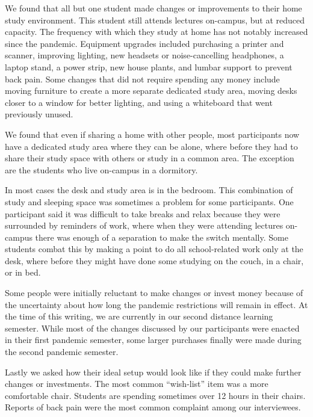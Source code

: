 \documentclass{sigchi}
\begin{document}
We found that all but one student made changes or improvements to their home study environment. This student still attends lectures on-campus, but at reduced capacity. The frequency with which they study at home has not notably increased since the pandemic. Equipment upgrades included purchasing a printer and scanner, improving lighting, new headsets or noise-cancelling headphones, a laptop stand, a power strip, new house plants, and lumbar support to prevent back pain. Some changes that did not require spending any money include moving furniture to create a more separate dedicated study area, moving desks closer to a window for better lighting, and using a whiteboard that went previously unused. 

We found that even if sharing a home with other people, most participants now have a dedicated study area where they can be alone, where before they had to share their study space with others or study in a common area. The exception are the students who live on-campus in a dormitory. 

In most cases the desk and study area is in the bedroom. This combination of study and sleeping space was sometimes a problem for some participants. One participant said it was difficult to take breaks and relax because they were surrounded by reminders of work, where when they were attending lectures on-campus there was enough of a separation to make the switch mentally. Some students combat this by making a point to do all school-related work only at the desk, where before they might have done some studying on the couch, in a chair, or in bed.

Some people were initially reluctant to make changes or invest money because of the uncertainty about how long the pandemic restrictions will remain in effect. At the time of this writing, we are currently in our second distance learning semester. While most of the changes discussed by our participants were enacted in their first pandemic semester, some larger purchases finally were made during the second pandemic semester.  

Lastly we asked how their ideal setup would look like if they could make further changes or investments. The most common ``wish-list'' item was a more comfortable chair. Students are spending sometimes over 12 hours in their chairs. Reports of back pain were the most common complaint among our interviewees.
\end{document}
